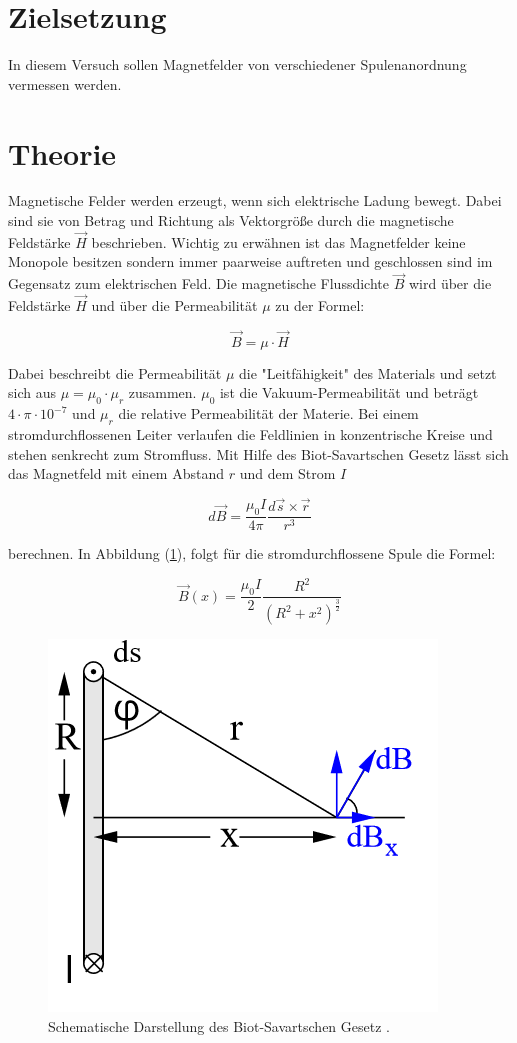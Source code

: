 \section{Zielsetzung}
In diesem Versuch sollen Magnetfelder von verschiedener Spulenanordnung vermessen werden.
\section{Theorie}
Magnetische Felder werden erzeugt, wenn sich elektrische Ladung bewegt.
Dabei sind sie von Betrag und Richtung als Vektorgröße durch die magnetische Feldstärke
$\vec{H}$ beschrieben. Wichtig zu erwähnen ist das Magnetfelder keine Monopole besitzen
sondern immer paarweise auftreten und geschlossen sind im Gegensatz zum elektrischen Feld.
Die magnetische Flussdichte $\vec{B}$ wird über die Feldstärke $\vec{H}$ und über die
Permeabilität $\mu$ zu der Formel:

\begin{equation}
  \vec{B} = \mu \cdot \vec{H}
  \label{eq:1}
\end{equation}

Dabei beschreibt die Permeabilität $\mu$ die "Leitfähigkeit" des Materials und setzt sich
aus $\mu = \mu_0 \cdot \mu_r$ zusammen. $\mu_0$ ist die Vakuum-Permeabilität und beträgt $4 \cdot \pi \cdot 10^{-7}$
und $\mu_r$ die relative Permeabilität der Materie.
Bei einem stromdurchflossenen Leiter verlaufen die Feldlinien in konzentrische Kreise und
stehen senkrecht zum Stromfluss. Mit Hilfe des Biot-Savartschen Gesetz lässt sich
das Magnetfeld mit einem Abstand $r$ und dem Strom $I$

\begin{equation*}
  d\vec{B} = \frac{\mu_0 I}{4\pi} \frac{d\vec{s} \times \vec{r}}{r^3}
\end{equation*}

berechnen. In Abbildung (\ref{abb:1}), folgt für die stromdurchflossene Spule die Formel:

\begin{equation}
  \vec{B}(x) = \frac{\mu_0 I}{2} \frac{R^2}{(R^2 + x^2)^{\frac{3}{2}}}
  \label{eq:2}
\end{equation}

\begin{figure}[H]
  \centering
  \includegraphics[width=5 cm , height=3.5 cm]{Abb1.png}
	\caption{Schematische Darstellung des Biot-Savartschen Gesetz \cite{1}.}
	\label{abb:1}
\end{figure}

